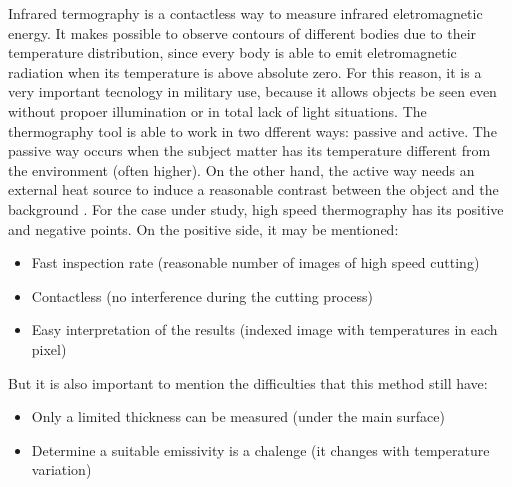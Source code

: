 	Infrared termography is a contactless way to measure infrared eletromagnetic energy. It makes possible to observe contours of different bodies due to their temperature distribution, since every body is able to emit eletromagnetic radiation when its temperature is above absolute zero. For this reason, it is a very important tecnology in military use, because it allows objects be seen even without propoer illumination or in total lack of light situations.
	The thermography tool is able to work in two dfferent ways: passive and active. The passive way occurs when the subject matter has its temperature different from the environment (often higher). On the other hand, the active way needs an external heat source to induce a reasonable contrast between the object and the background \cite {maldague2000}.
	For the case under study, high speed thermography has its positive and negative points. On the positive side, it may be mentioned:
	\begin{itemize}
		\item Fast inspection rate (reasonable number of images of high speed cutting)
		\item Contactless (no interference during the cutting process)
		\item Easy interpretation of the results (indexed image with temperatures in each pixel)
	\end{itemize}
	But it is also important to mention the difficulties that this method still have:
	\begin{itemize}
		\item Only a limited thickness can be measured (under the main surface)
		\item Determine a suitable emissivity is a chalenge (it changes with temperature variation)
	\end{itemize}